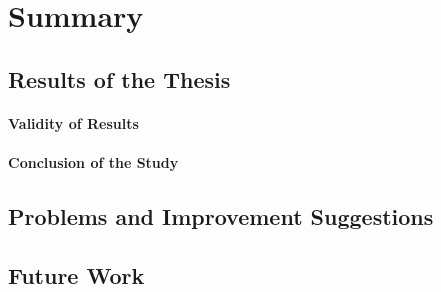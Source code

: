 

\section{Summary} %
\label{sec:summary}

\subsection{Results of the Thesis} %
\label{sub:results_of_the_thesis}

\paragraph{Validity of Results}
\paragraph{Conclusion of the Study}


\subsection{Problems and Improvement Suggestions} %
\label{sub:problems_and_improvement_suggestions}


\subsection{Future Work} %
\label{sub:future_work}


